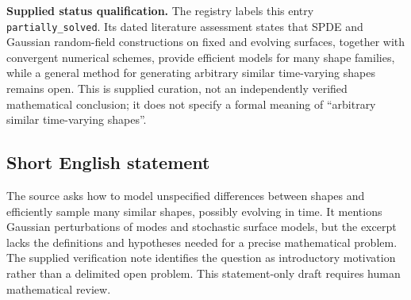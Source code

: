 \documentclass[11pt]{article}
\begin{document}
\textbf{Supplied status qualification.} The registry labels this entry \texttt{partially\_solved}. Its dated literature assessment states that SPDE and Gaussian random-field constructions on fixed and evolving surfaces, together with convergent numerical schemes, provide efficient models for many shape families, while a general method for generating arbitrary similar time-varying shapes remains open. This is supplied curation, not an independently verified mathematical conclusion; it does not specify a formal meaning of ``arbitrary similar time-varying shapes''.
\subsection{Short English statement}
The source asks how to model unspecified differences between shapes and efficiently sample many similar shapes, possibly evolving in time. It mentions Gaussian perturbations of modes and stochastic surface models, but the excerpt lacks the definitions and hypotheses needed for a precise mathematical problem. The supplied verification note identifies the question as introductory motivation rather than a delimited open problem. This statement-only draft requires human mathematical review.
\end{document}
